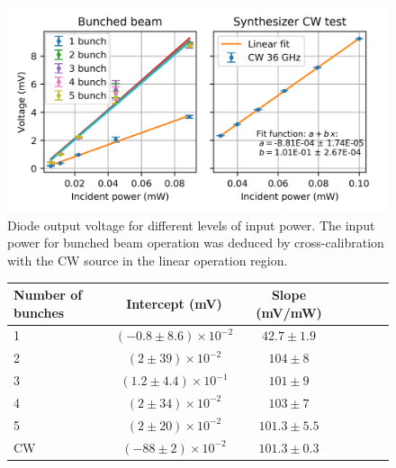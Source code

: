 \begin{figure}[!t]
\centering
\hspace{40mm}
\includegraphics[scale=1, keepaspectratio]{pictures/bunch_number_vs_CW_linear_region.png}
\caption{Diode output voltage for different levels of input power. The input power for bunched beam operation was deduced by  cross-calibration with the CW source in the linear operation region.}
\label{fig:long_wg_linearity_scan_fit}

\end{figure}


\begin{figure}[!t]
\centering

\begin{tabular}{l c c c c c c}
\toprule
Number of bunches & Intercept (mV) & Slope (mV/mW)\\
\midrule
1 & $(-0.8\pm8.6)\times10^{-2}$ & $42.7\pm1.9$  \\
2 & $(2\pm39)\times10^{-2}$ & $104\pm8$  \\
3 & $(1.2\pm4.4)\times10^{-1}$ & $101\pm9$  \\
4 & $(2\pm34)\times10^{-2}$ & $103\pm7$  \\
5 & $(2\pm20)\times10^{-2}$ & $101.3\pm5.5$ \\
CW & $(-88\pm2)\times10^{-2}$ & $101.3\pm0.3$ \\
\bottomrule
\end{tabular}
 \label{tab:fit_bunch_num_scan}

\end{figure}







